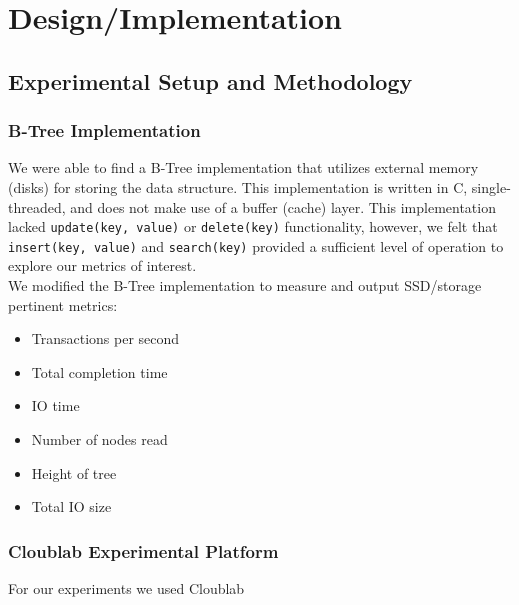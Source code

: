 
\section{Design/Implementation}


\subsection{Experimental Setup and Methodology}

\subsubsection{B-Tree Implementation}
We were able to find a B-Tree implementation \cite{externalbtree} that utilizes external memory (disks) for storing the data structure. This implementation is written in C, single-threaded, and does not make use of a buffer (cache) layer. This implementation lacked \texttt{update(key, value)} or \texttt{delete(key)} functionality, however, we felt that \texttt{insert(key, value)} and \texttt{search(key)} provided a sufficient level of operation to explore our metrics of interest.\\

We modified the B-Tree implementation to measure and output SSD/storage pertinent metrics:
\begin{itemize}
\setlength\itemsep{0em}
    \item Transactions per second
    \item Total completion time
    \item IO time
    \item Number of nodes read
    \item Height of tree
    \item Total IO size
\end{itemize}



\subsubsection{Cloublab Experimental Platform}
For our experiments we used Cloublab \cite{cloublab}






